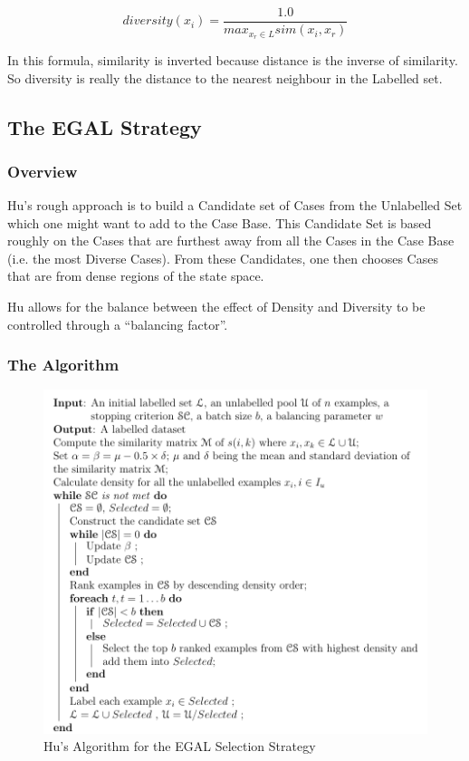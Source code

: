\documentclass[a4paper,11pt]{report}
\begin{document}
\[
diversity(x_{i})=\frac{1.0}{max_{x_{r}\in L}sim(x_{i},x_{r})}
\]

In this formula, similarity is inverted because distance is the inverse of similarity. So diversity is really the distance to the nearest neighbour in the Labelled set.

\subsection{The EGAL Strategy}

\subsubsection{Overview}
Hu's rough approach is to build a Candidate set of Cases from the Unlabelled Set which one might want to add to the Case Base. This Candidate Set is based roughly on the Cases that are furthest away from all the Cases in the Case Base (i.e. the most Diverse Cases). From these Candidates, one then chooses Cases that are from dense regions of the state space.

Hu allows for the balance between the effect of Density and Diversity to be controlled through a ``balancing factor''.

\pagebreak %

\begin{samepage}

\subsubsection{The Algorithm} 

\begin{figure}[h!]
\includegraphics[scale=0.75]{./Others/Hu2011EgalAlgorithm}
\caption{Hu's Algorithm for the EGAL Selection Strategy}
\end{figure}

\end{samepage}
\end{document}
